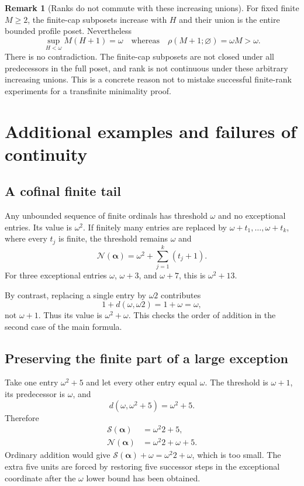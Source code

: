 \documentclass[11pt,a4paper]{article}
\theoremstyle{definition}
\newtheorem{remark}[theorem]{Remark}
\newcommand{\OpN}{\mathcal N}
\newcommand{\OpS}{\mathcal S}
\newcommand{\emptyheads}{\varnothing}
\newcommand{\seq}[1]{\boldsymbol{#1}}
\newcommand{\diff}[2]{d(#1,#2)}
\begin{document}
\begin{remark}[Ranks do not commute with these increasing unions]
For fixed finite $M\ge2$, the finite-cap subposets increase with $H$ and their
union is the entire bounded profile poset. Nevertheless
\[
 \sup_{H<\omega}M(H+1)=\omega
 \quad\text{whereas}\quad
 \rho(M+1;\emptyheads)=\omega M>\omega.
\]
There is no contradiction. The finite-cap subposets are not closed under
all predecessors in the full poset, and rank is not continuous under these
arbitrary increasing unions. This is a concrete reason not to mistake
successful finite-rank experiments for a transfinite minimality proof.
\end{remark}

\section{Additional examples and failures of continuity}\label{block:sec:examples}

\subsection{A cofinal finite tail}

Any unbounded sequence of finite ordinals has threshold $\omega$ and no exceptional entries. Its value is $\omega^2$. If finitely many entries are replaced by $\omega+t_1,\ldots,\omega+t_k$, where every $t_j$ is finite, the threshold remains $\omega$ and
\begin{equation}\label{block:eq:near-example}
 \OpN(\seq\alpha)=\omega^2+\sum_{j=1}^k(t_j+1).
\end{equation}
For three exceptional entries $\omega$, $\omega+3$, and $\omega+7$, this is $\omega^2+13$.

By contrast, replacing a single entry by $\omega2$ contributes
\[
 1+\diff\omega{\omega2}=1+\omega=\omega,
\]
not $\omega+1$. Thus its value is $\omega^2+\omega$. This checks the order of addition in the second case of the main formula.

\subsection{Preserving the finite part of a large exception}

Take one entry $\omega^2+5$ and let every other entry equal $\omega$. The threshold is $\omega+1$, its predecessor is $\omega$, and
\[
 \diff\omega{\omega^2+5}=\omega^2+5.
\]
Therefore
\begin{align*}
 \OpS(\seq\alpha)&=\omega^2 2+5,\\
 \OpN(\seq\alpha)&=\omega^2 2+\omega+5.
\end{align*}
Ordinary addition would give $\OpS(\seq\alpha)+\omega=\omega^2 2+\omega$, which is too small. The extra five units are forced by restoring five successor steps in the exceptional coordinate after the $\omega$ lower bound has been obtained.
\end{document}
